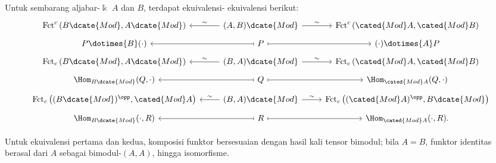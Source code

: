 \begin{theorem}\label{prop:Morita}
	Untuk sembarang aljabar-$\Bbbk$ $A$ dan $B$, terdapat ekuivalensi-
	ekuivalensi berikut:
	\[\begin{tikzcd}[row sep=tiny]
		\mathrm{Fct}^c\left(B\dcate{Mod}, A\dcate{Mod}\right) & (A, B)\dcate{Mod} \arrow[l, "\sim"'] \arrow[r, "\sim"] & \mathrm{Fct}^c\left(\cated{Mod}A, \cated{Mod}B\right) \\
		P \dotimes{B} (\cdot) & P \arrow[mapsto, l] \arrow[mapsto, r] & (\cdot) \dotimes{A} P \\
		\mathrm{Fct}_c\left(B\dcate{Mod}, A\dcate{Mod}\right) & (B, A)\dcate{Mod} \arrow[l, "\sim"'] \arrow[r, "\sim"] & \mathrm{Fct}_c\left(\cated{Mod}A, \cated{Mod}B\right) \\
		\Hom_{B\dcate{Mod}}(Q, \cdot) & Q \arrow[mapsto, l] \arrow[mapsto, r] & \Hom_{\cated{Mod}A}(Q, \cdot) \\
		\mathrm{Fct}_c\left((B\dcate{Mod})^{\opp}, \cated{Mod}A \right) & (B, A)\dcate{Mod} \arrow[l, "\sim"'] \arrow[r, "\sim"] & \mathrm{Fct}_c\left((\cated{Mod}A)^{\opp}, B\dcate{Mod}\right) \\
		\Hom_{B\dcate{Mod}}(\cdot, R) & R \arrow[mapsto, l] \arrow[mapsto, r] & \Hom_{\cated{Mod}A}(\cdot, R).
	\end{tikzcd}\]

	Untuk ekuivalensi pertama dan kedua, komposisi funktor bersesuaian dengan
	hasil kali tensor bimodul; bila $A=B$, funktor identitas berasal dari $A$
	sebagai bimodul-$(A,A)$, hingga isomorfisme.
\end{theorem}

